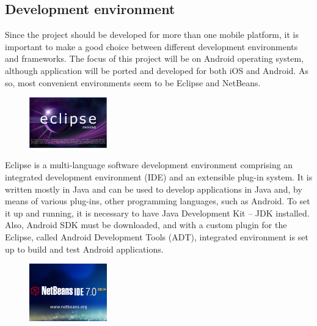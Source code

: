 \pagebreak
\subsection{Development environment}

Since the project should be developed for more than one mobile platform, it is important to make a good choice between different development environments and frameworks. The focus of this project will be on Android operating system, although application will be ported and developed for both iOS and Android.
As so, most convenient environments seem to be Eclipse and NetBeans.\newline

\begin{figure}[htb]
	\centering
	\includegraphics[width=0.3\textwidth]{prestudy/development_environment/Eclipse.png}
	\caption{}
	\label{fig:Eclipse Indigo}
\end{figure}
	
Eclipse is a multi-language software development environment comprising an integrated development environment (IDE) and an extensible plug-in system. It is written mostly in Java and can be used to develop applications in Java and, by means of various plug-ins, other programming languages, such as Android. 
To set it up and running, it is necessary to have Java Development Kit – JDK installed. Also, Android SDK must be downloaded, and with a custom plugin for the Eclipse, called Android Development Tools (ADT), integrated environment is set up to build and test Android applications.\newline

\begin{figure}[htb]
	\centering
	\includegraphics[width=0.3\textwidth]{prestudy/development_environment/netBeans.png}
	\caption{}
	\label{fig:NetBeans}
\end{figure}

